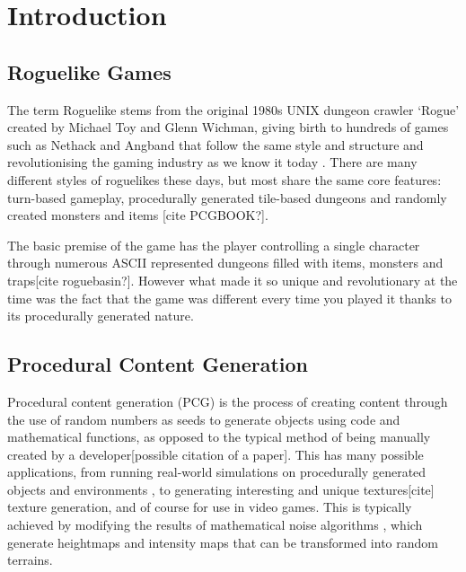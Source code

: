 \documentclass[12pt,a4paper]{article}
\begin{document}
\section{Introduction}
\subsection{Roguelike Games} \label{ssec:rogue}


The term Roguelike stems from the original 1980s UNIX dungeon crawler `Rogue' created by Michael Toy and Glenn Wichman, giving birth to hundreds of games such as Nethack and Angband that follow the same style and structure and revolutionising the gaming industry as we know it today \cite{Dunhack}. There are many different styles of roguelikes these days, but most share the same core features: turn-based gameplay, procedurally generated tile-based dungeons and randomly created monsters and items [cite PCGBOOK?]. 

The basic premise of the game has the player controlling a single character through numerous ASCII represented dungeons filled with items, monsters and traps[cite roguebasin?]. However what made it so unique and revolutionary at the time was the fact that the game was different every time you played it thanks to its procedurally generated nature. 



\subsection{Procedural Content Generation} \label{ssec:PCG}


Procedural content generation (PCG) is the process of creating content through the use of random numbers as seeds to generate objects using code and mathematical functions, as opposed to the typical method of being manually created by a developer[possible citation of a paper]. This has many possible applications, from running real-world simulations on procedurally generated objects and environments \cite{vast}, to generating interesting and unique textures[cite] texture generation, and of course for use in video games. This is typically achieved by modifying the results of mathematical noise algorithms \cite{pgcbookch4}, which generate heightmaps and intensity maps that can be transformed into random terrains. \\
\end{document}
